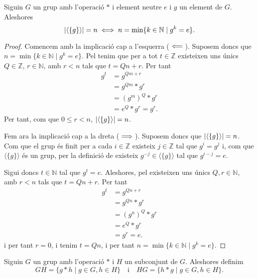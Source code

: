 \documentclass[../Apunts.tex]{subfiles}
\begin{document}
	\begin{proposition}
		\label{prop:potencia element neutre en un grup}
		Siguin \(G\) un grup amb l'operació \(\ast\) i element neutre \(e\) i \(g\) un element de \(G\). Aleshores
		\[\abs{\langle\{g\}\rangle}=n\sii n=\min\{k\in\mathbb{N}\mid g^{k}=e\}.\]
		\begin{proof}
			Comencem amb la implicació cap a l'esquerra (\(\impliedby\)). Suposem doncs que \(n=\min\{k\in\mathbb{N}\mid g^{k}=e\}\). Pel  tenim que per a tot \(t\in\mathbb{Z}\) existeixen uns únics \(Q\in\mathbb{Z}\), \(r\in\mathbb{N}\), amb \(r<n\) tals que \(t=Qn+r\). Per tant
			\begin{align*}
			g^{t}&=g^{Qm+r}\\
			&=g^{Qm}\ast g^{r}\\
			&=(g^{m})^{Q}\ast g^{r}\\
			&=e^{Q}\ast g^{r}=g^{r}.
			\end{align*}
			Per tant, com que \(0\leq r<n\), \(\abs{\langle\{g\}\rangle}=n\).
			
			Fem ara la implicació cap a la dreta (\(\implies\)). Suposem doncs que \(\abs{\langle\{g\}\rangle}=n\). Com que el grup és finit per a cada \(i\in\mathbb{Z}\) existeix \(j\in\mathbb{Z}\) tal que \(g^{i}=g^{j}\) i, com que \(\langle\{g\}\rangle\) és un grup, per la definició de  existeix \(g^{-j}\in\langle\{g\}\rangle\) tal que \(g^{i-j}=e\).
			
			Sigui doncs \(t\in\mathbb{N}\) tal que \(g^{t}=e\). Aleshores, pel  existeixen uns únics \(Q,r\in\mathbb{N}\), amb \(r<n\) tals que \(t=Qn+r\). Per tant
			\begin{align*}
			g^{t}&=g^{Qn+r}\\
			&=g^{Qn}\ast g^{r}\\
			&=(g^{n})^{Q}\ast g^{r}\\
			&=e^{Q}\ast g^{r}\\
			&=g^{r}=e.
			\end{align*}
			i per tant \(r=0\), i tenim \(t=Qn\), i per tant \(n=\min\{k\in\mathbb{N}\mid g^{k}=e\}\).
		\end{proof}
	\end{proposition}
	\begin{definition}
		\label{def:conjugació entre conjunts sobre grups}
		Siguin \(G\) un grup amb l'operació \(\ast\) i \(H\) un subconjunt de \(G\). Aleshores definim
		\[GH=\{g\ast h\mid g\in G,h\in H\}\quad\text{i}\quad HG=\{h\ast g\mid g\in G,h\in H\}.\]
	\end{definition}
\end{document}
